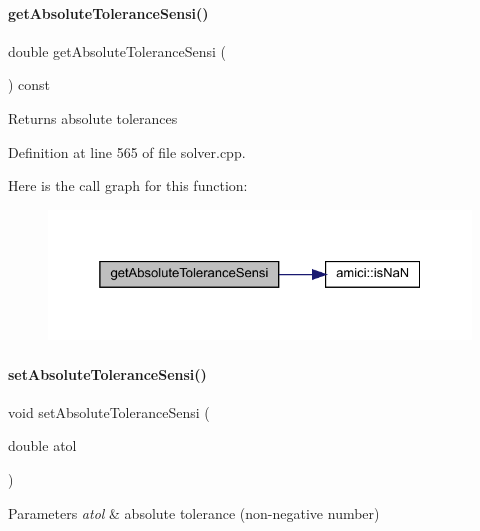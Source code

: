 \paragraph{\texorpdfstring{get\+Absolute\+Tolerance\+Sensi()}{getAbsoluteToleranceSensi()}}
{\footnotesize\ttfamily double get\+Absolute\+Tolerance\+Sensi (\begin{DoxyParamCaption}{ }\end{DoxyParamCaption}) const}

\begin{DoxyReturn}{Returns}
absolute tolerances 
\end{DoxyReturn}


Definition at line 565 of file solver.\+cpp.

Here is the call graph for this function\+:
\nopagebreak
\begin{figure}[H]
\begin{center}
\leavevmode
\includegraphics[width=325pt]{classamici_1_1_solver_aef5bbdb68233061923a99a5f448b263a_cgraph}
\end{center}
\end{figure}
\mbox{\label{classamici_1_1_solver_a6f804c48badcbc0dc32da4379c7ff091}} 
\paragraph{\texorpdfstring{set\+Absolute\+Tolerance\+Sensi()}{setAbsoluteToleranceSensi()}}
{\footnotesize\ttfamily void set\+Absolute\+Tolerance\+Sensi (\begin{DoxyParamCaption}\item[{double}]{atol }\end{DoxyParamCaption})}


\begin{DoxyParams}{Parameters}
{\em atol} & absolute tolerance (non-\/negative number) \\
\hline
\end{DoxyParams}


